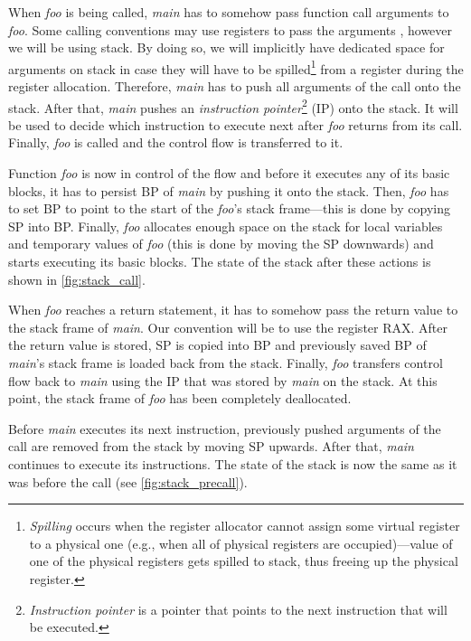 \documentclass[thesis=M,english]{FITthesis}[2019/12/23]
\begin{document}
When \emph{foo} is being called, \emph{main} has to somehow pass function call arguments to \emph{foo}. Some calling conventions may use registers to pass the arguments \cite[Chap. 7]{calling_convention}, however we will be using stack. By doing so, we will implicitly have dedicated space for arguments on stack in case they will have to be spilled\footnote{\emph{Spilling} occurs when the register allocator cannot assign some virtual register to a physical one \cite[Chap. 7.2.3]{eng_comp} (e.g., when all of physical registers are occupied)---value of one of the physical registers gets spilled to stack, thus freeing up the physical register.} from a register during the register allocation. Therefore, \emph{main} has to push all arguments of the call onto the stack. After that, \emph{main} pushes an \emph{instruction pointer}\footnote{\emph{Instruction pointer} is a pointer that points to the next instruction that will be executed.} (IP) onto the stack. It will be used to decide which instruction to execute next after \emph{foo} returns from its call. Finally, \emph{foo} is called and the control flow is transferred to it.

Function \emph{foo} is now in control of the flow and before it executes any of its basic blocks, it has to persist BP of \emph{main} by pushing it onto the stack. Then, \emph{foo} has to set BP to point to the start of the \emph{foo}'s stack frame---this is done by copying SP into BP. Finally, \emph{foo} allocates enough space on the stack for local variables and temporary values of \emph{foo} (this is done by moving the SP downwards) and starts executing its basic blocks. The state of the stack after these actions is shown in \autoref{fig:stack_call}.

When \emph{foo} reaches a return statement, it has to somehow pass the return value to the stack frame of \emph{main}. Our convention will be to use the register RAX. After the return value is stored, SP is copied into BP and previously saved BP of \emph{main}'s stack frame is loaded back from the stack. Finally, \emph{foo} transfers control flow back to \emph{main} using the IP that was stored by \emph{main} on the stack. At this point, the stack frame of \emph{foo} has been completely deallocated.

Before \emph{main} executes its next instruction, previously pushed arguments of the call are removed from the stack by moving SP upwards. After that, \emph{main} continues to execute its instructions. The state of the stack is now the same as it was before the call (see \autoref{fig:stack_precall}).
\end{document}
